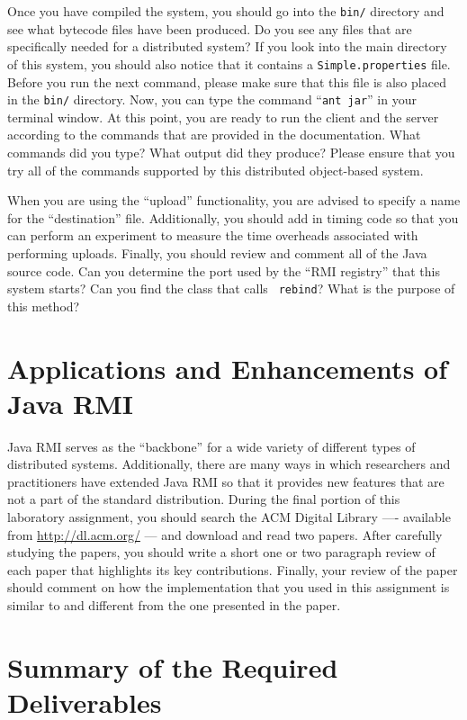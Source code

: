 Once you have compiled the system, you should go into the {\tt bin/} directory and see what bytecode files have been
produced. Do you see any files that are specifically needed for a distributed system? If you look into the main
directory of this system, you should also notice that it contains a {\tt Simple.properties} file. Before you run the
next command, please make sure that this file is also placed in the {\tt bin/} directory. Now, you can type the command
``{\tt ant jar}'' in your terminal window. At this point, you are ready to run the client and the server according to
the commands that are provided in the documentation. What commands did you type? What output did they produce? Please
ensure that you try all of the commands supported by this distributed object-based system.

When you are using the ``upload'' functionality, you are advised to specify a name for the ``destination'' file.
Additionally, you should add in timing code so that you can perform an experiment to measure the time overheads
associated with performing uploads. Finally, you should review and comment all of the Java source code.  Can you
determine the port used by the ``RMI registry'' that this system starts? Can you find the class that calls {\tt
rebind}? What is the purpose of this method?

\section*{Applications and Enhancements of Java RMI}

Java RMI serves as the ``backbone'' for a wide variety of different types of distributed systems. Additionally, there
are many ways in which researchers and practitioners have extended Java RMI so that it provides new features that are
not a part of the standard distribution. During the final portion of this laboratory assignment, you should search the
ACM Digital Library ---- available from \url{http://dl.acm.org/} --- and download and read two papers. After carefully
studying the papers, you should write a short one or two paragraph review of each paper that highlights its key
contributions. Finally, your review of the paper should comment on how the implementation that you used in this
assignment is similar to and different from the one presented in the paper.

\section*{Summary of the Required Deliverables}

